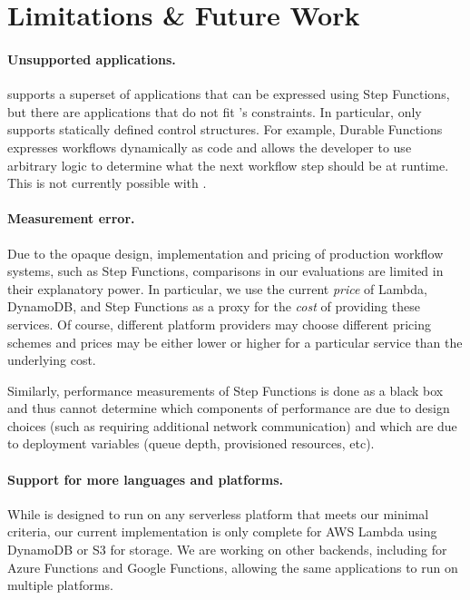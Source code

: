 \section{Limitations \& Future Work}\label{sec:limitations}

\paragraph{Unsupported applications.} \name{} supports a superset of
applications that can be expressed using Step Functions, but there are
applications that do not fit \name{}'s constraints. In particular, \name{} only
supports statically defined control structures. For example, Durable Functions
expresses workflows dynamically as code and allows the developer to use
arbitrary logic to determine what the next workflow step should be at runtime.
This is not currently possible with \name{}.

\paragraph{Measurement error.} Due to the opaque design, implementation and
pricing of production workflow systems, such as Step Functions, comparisons in
our evaluations are limited in their explanatory power. In particular, we use
the current \emph{price} of Lambda, DynamoDB, and Step Functions as a proxy for
the \emph{cost} of providing these services. Of course, different platform
providers may choose different pricing schemes and prices may be either lower or
higher for a particular service than the underlying cost.

Similarly, performance measurements of Step Functions is done as a black box and
thus cannot determine which components of performance are due to design choices
(such as requiring additional network communication) and which are due to
deployment variables (queue depth, provisioned resources, etc).

\paragraph{Support for more languages and platforms.} While \name{} is designed
to run on any serverless platform that meets our minimal criteria, our current
implementation is only complete for AWS Lambda using DynamoDB or S3 for storage.
We are working on other backends, including for Azure Functions and Google
Functions, allowing the same applications to run on multiple platforms.

